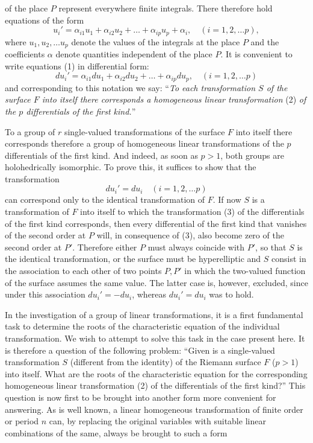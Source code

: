 \documentclass{article}
\begin{document}
of the place $P$ represent everywhere finite integrals. There therefore hold equations of the form
\[
u_i' = \alpha_{i1} u_1 + \alpha_{i2} u_2 + \dots + \alpha_{ip} u_p + \alpha_i, \quad (i = 1, 2, \dots p),
\tag{1}
\]
where $u_1, u_2, \dots u_p$ denote the values of the integrals at the place $P$ and the coefficients $\alpha$ denote quantities independent of the place $P$. It is convenient to write equations (1) in differential form:
\[
du_i' = \alpha_{i1} du_1 + \alpha_{i2} du_2 + \dots + \alpha_{ip} du_p, \quad (i = 1, 2, \dots p)
\tag{2}
\]
and corresponding to this notation we say:
``\emph{To each transformation $S$ of the surface $F$ into itself there corresponds a homogeneous linear transformation} (2) \emph{of the $p$ differentials of the first kind.}''

To a group of $r$ single-valued transformations of the surface $F$ into itself there corresponds therefore a group of homogeneous linear transformations of the $p$ differentials of the first kind. And indeed, as soon as $p > 1$, both groups are holohedrically isomorphic. To prove this, it suffices to show that the transformation
\[
du_i' = du_i \quad (i = 1, 2, \dots p)
\tag{3}
\]
can correspond only to the identical transformation of $F$. If now $S$ is a transformation of $F$ into itself to which the transformation (3) of the differentials of the first kind corresponds, then every differential of the first kind that vanishes of the second order at $P$ will, in consequence of (3), also become zero of the second order at $P'$. Therefore either $P$ must always coincide with $P'$, so that $S$ is the identical transformation, or the surface must be hyperelliptic and $S$ consist in the association to each other of two points $P, P'$ in which the two-valued function of the surface assumes the same value. The latter case is, however, excluded, since under this association $du_i' = - du_i$, whereas $du_i' = du_i$ was to hold.

In the investigation of a group of linear transformations, it is a first fundamental task to determine the roots of the characteristic equation of the individual transformation. We wish to attempt to solve this task in the case present here. It is therefore a question of the following problem:
``Given is a single-valued transformation $S$ (different from the identity) of the Riemann surface $F$ ($p > 1$) into itself. What are the roots of the characteristic equation for the corresponding homogeneous linear transformation (2) of the differentials of the first kind?'' This question is now first to be brought into another form more convenient for answering. As is well known, a linear homogeneous transformation of finite order or period $n$ can, by replacing the original variables with suitable linear combinations of the same, always be brought to such a form
\end{document}

